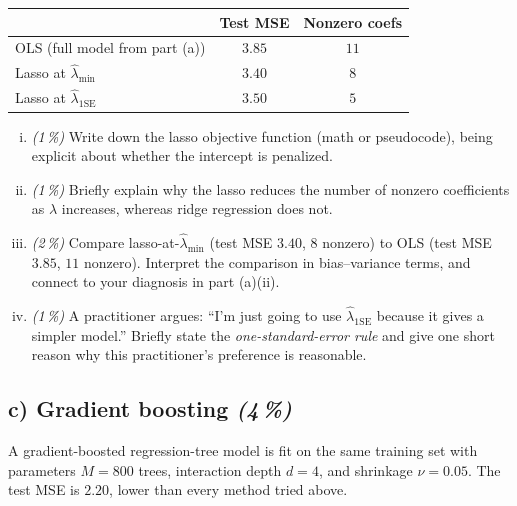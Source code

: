 \documentclass[11pt,a4paper]{article}
\newcommand{\subpoints}[1]{\textit{(#1\,\%)}}
\begin{document}
\begin{center}\small
\begin{tabular}{lcc}
\toprule
                                                 & \textbf{Test MSE} & \textbf{Nonzero coefs} \\
\midrule
OLS (full model from part (a))                   & $3.85$            & $11$ \\
Lasso at $\hat\lambda_{\min}$                    & $3.40$            & $8$  \\
Lasso at $\hat\lambda_{1\text{SE}}$              & $3.50$            & $5$  \\
\bottomrule
\end{tabular}
\end{center}

\begin{enumerate}[(i)]
  \item \subpoints{1} Write down the lasso objective function (math or pseudocode), being explicit about whether the intercept is penalized.
  \item \subpoints{1} Briefly explain why the lasso reduces the number of nonzero coefficients as $\lambda$ increases, whereas ridge regression does not.
  \item \subpoints{2} Compare lasso-at-$\hat\lambda_{\min}$ (test MSE $3.40$, $8$ nonzero) to OLS (test MSE $3.85$, $11$ nonzero). Interpret the comparison in bias--variance terms, and connect to your diagnosis in part (a)(ii).
  \item \subpoints{1} A practitioner argues: ``I'm just going to use $\hat\lambda_{1\mathrm{SE}}$ because it gives a simpler model.'' Briefly state the \emph{one-standard-error rule} and give one short reason why this practitioner's preference is reasonable.
\end{enumerate}

\subsection*{c) Gradient boosting \subpoints{4}}

A gradient-boosted regression-tree model is fit on the same training set with parameters $M = 800$ trees, interaction depth $d = 4$, and shrinkage $\nu = 0.05$. The test MSE is $2.20$, lower than every method tried above.
\end{document}
